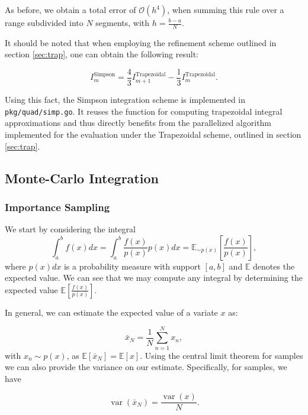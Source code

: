 \documentclass[10pt, a4paper]{article}
\begin{document}
  As before, we obtain a total error of $\mathcal{O}(h^4)$, when summing this rule over a range subdivided
  into $N$ segments, with $h = \frac{b-a}{N}$.

  It should be noted that when employing the refinement scheme outlined in section \ref{sec:trap},
  one can obtain the following result\cite{nr}:

  \begin{equation}
  I_m^{\text{Simpson}} = \frac{4}{3} I_{m+1}^{\text{Trapezoidal}} - \frac{1}{3} I_m^{\text{Trapezoidal}}.
  \end{equation}

  Using this fact, the Simpson integration scheme is implemented in \texttt{pkg/quad/simp.go}. It
  reuses the function for computing trapezoidal integral approximations and thus directly benefits from
  the parallelized algorithm implemented for the evaluation under the Trapezoidal scheme, outlined in
  section \ref{sec:trap}.

\subsection{Monte-Carlo Integration}
  \subsubsection{Importance Sampling}
  We start by considering the integral
  \begin{equation}
  \int_a^b f(x) dx = \int_{a}^{b} \frac{f(x)}{p(x)} p(x) dx = \mathbb{E}_{\sim p(x)}\left[ \frac{f(x)}{p(x)} \right],
  \end{equation}
  where $p(x)dx$ is a probability measure with support $[a, b]$ and $\mathbb{E}$ denotes the expected
  value. We can see that we may compute any integral by determining the expected value
  $\mathbb{E}\left[ \frac{f(x)}{p(x)} \right]$.

  In general, we can estimate the expected value of a variate $x$ as:

  \begin{equation}
  \bar{x}_N = \frac{1}{N} \sum_{n=1}^N x_n,
  \end{equation}
  with $x_n \sim p(x)$, as $\mathbb{E}[\bar{x}_N] = \mathbb{E}[x]$. Using the central limit theorem for
  \iid{} samples we can also provide the variance on our estimate. Specifically, for \iid{} samples,
  we have

  \begin{equation}
  \label{eq:var}
  \operatorname{var}(\bar{x}_N) = \frac{\operatorname{var}(x)}{N}.
  \end{equation}
\end{document}
